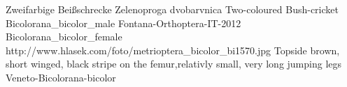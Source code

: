 {Zweifarbige Beißschrecke} %
{Zelenoproga dvobarvnica} %
{Two-coloured Bush-cricket} %
{Bicolorana_bicolor_male} %
{Fontana-Orthoptera-IT-2012}%
{Bicolorana_bicolor_female} %
{http://www.hlasek.com/foto/metrioptera_bicolor_bi1570.jpg}
{Topside brown, short winged, black stripe on the femur,relativly small, very long jumping legs} %
{} %
{Veneto-Bicolorana-bicolor} %